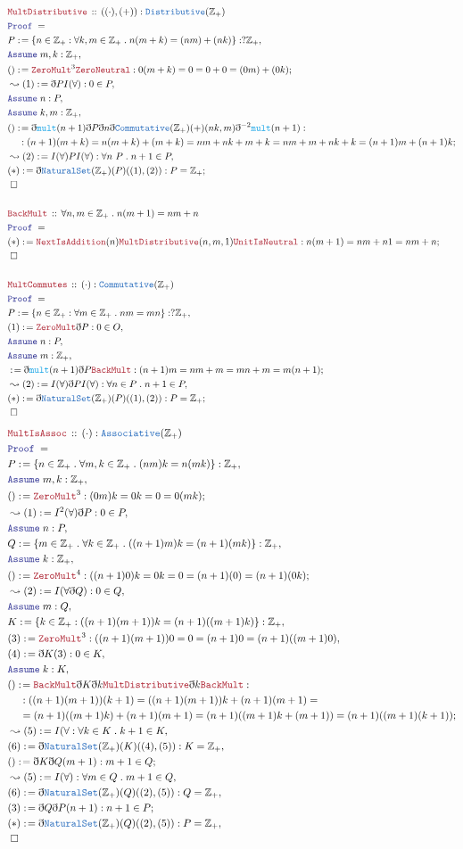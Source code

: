 \documentclass[12pt]{scrartcl}
\newcommand{\TYPE}[1]{\textcolor{NavyBlue}{\mathtt{#1}}}
\newcommand{\FUNC}[1]{\textcolor{Cerulean}{\mathtt{#1}}}
\newcommand{\LOGIC}[1]{\textcolor{Blue}{\mathtt{#1}}}
\newcommand{\THM}[1]{\textcolor{Maroon}{\mathtt{#1}}}
\renewcommand{\.}{\; . \;}
\newcommand{\de}{: \kern 0.1pc =}
\newcommand{\Theorem}[2]{& \THM{#1} \, :: \, #2 \\ & \Proof = \\ }
\newcommand{\NewLine}{\\ & \kern 1pc}
\newcommand{\Page}[1]{ \begin{align*} #1 \end{align*}   }
\newcommand{ \bd }{ \ByDef }
\newcommand{\Int}{\mathbb{Z} }
\newcommand{\Say}[3]{& #1 \de #2 : #3, \\}
\newcommand{\Conclude}[3]{& #1 \de #2 : #3; \\}
\newcommand{\Derive}[3]{& \leadsto #1 \de #2 : #3, \\}
\newcommand{\Assume}[2]{& \LOGIC{Assume} \; #1 : #2, \\}
\newcommand{\QED}{\; \square}
\newcommand{\EndProof}{& \QED \\}
\newcommand{\ByDef}{\eth}
\newcommand{\Proof}{\LOGIC{Proof} \; }
\begin{document}
\Page{
	\Theorem{MultDistributive}{ ((\cdot),(+)) : \TYPE{Distributive}(\Int_+)}
	\Say{P}{\{ n \in \Int_+ : \forall k,m \in \Int_+ \. n(m + k) = (nm) + (nk) \}}{?\Int_+}
	\Assume{m,k}{\Int_+}
	\Conclude{()}{\THM{ZeroMult}^3 \THM{ZeroNeutral}}{ 0(m + k) = 0 = 0 + 0 = (0m) + (0k) }
	\Derive{(1)}{\bd P I(\forall)}{0 \in P}
	\Assume{n}{P}
	\Assume{k,m}{\Int_+}
	\Conclude{()}{\bd \FUNC{mult}(n + 1) \bd P \bd n \bd \TYPE{Commutative}(\Int_+)(+)(nk,m)\bd^{-2} \FUNC{mult}(n + 1) }{ 
		\NewLine:
		(n + 1)(m + k) = 
		n(m + k) + (m + k) = 
		nm + nk + m + k = 
		nm + m + nk +k = 
		(n +1)m + (n + 1)k
		}
	\Derive{(2)}{I(\forall)PI(\forall)}{ \forall n \ P \. n + 1 \in P   }
	\Conclude{(*)}{\bd \TYPE{NaturalSet}(\Int_+)(P)((1),(2))}{P = \Int_+}
	\EndProof
	\\
	\Theorem{BackMult}{\forall n,m \in \Int_+ \. n(m + 1) = nm + n}
	\Conclude{(*)}{\THM{NextIsAddition}(n)\THM{MultDistributive}(n,m,1)\THM{UnitIsNeutral}}{n(m + 1) = nm + n1 = nm + n}
	\EndProof
	\\
	\Theorem{MultCommutes}{(\cdot) : \TYPE{Commutative}(\Int_+)}
	\Say{P}{\{ n \in \Int_+ : \forall m \in \Int_+ \. nm = mn \} }{?\Int_+}
	\Say{(1)}{\THM{ZeroMult}\bd P}{0 \in O}
	\Assume{n}{P}
	\Assume{m}{\Int_+}
	\Conclude{}{\bd \FUNC{mult}(n + 1) \bd P \THM{BackMult} }{ (n + 1)m = nm + m = mn + m = m(n + 1) }
	\Derive{(2)}{I(\forall)\bd P I(\forall)}{ \forall n \in P \. n + 1 \in P }
	\Conclude{(*)}{\bd \TYPE{NaturalSet}(\Int_+)(P)((1),(2))}{ P = \Int_+  }                                         
	\EndProof
}
\Page{
	\Theorem{MultIsAssoc}{(\cdot) : \TYPE{Associative}(\Int_+)}
	\Say{P}{\{ n \in \Int_+ \. \forall m,k \in \Int_+ \. (n m) k = n (m  k) \}}{\Int_+}
	\Assume{m,k}{\Int_+}                    
	\Conclude{()}{\THM{ZeroMult}^3}{(0 m) k = 0 k = 0 = 0 (m k)}
	\Derive{(1)}{I^2(\forall)\bd P}{0 \in P}
	\Assume{n}{P}
	\Say{Q}{\{ m \in \Int_+ \. \forall k \in \Int_+ \. ((n + 1)m)k  = (n + 1)(mk) \}}{\Int_+}
	\Assume{k}{\Int_+}
	\Conclude{()}{\THM{ZeroMult}^4}{((n + 1)0)k = 0k = 0 = (n + 1)(0) = (n+1)(0k) }
	\Derive{(2)}{I(\forall \bd Q)}{0 \in Q}
	\Assume{m}{Q}
	\Say{K}{\{k \in \Int_+ : ((n + 1)(m + 1))k = (n + 1)((m + 1)k)  \}}{\Int_+}
	\Say{(3)}{\THM{ZeroMult}^3 }{ ((n + 1)(m + 1))0 = 0 = (n +1 )0 = (n + 1)((m + 1)0)    }
	\Say{(4)}{\bd  K (3)}{0 \in K}
	\Assume{k}{K}
	\Conclude{()}{\THM{BackMult}\bd K \bd k \THM{MultDistributive}\bd k \THM{BackMult}}
	{ 
		\NewLine :
		((n + 1)(m + 1))(k + 1) =  
		((n + 1)(m + 1) )k  +   (n + 1)(m + 1) = 
		\NewLine =
		(n + 1)((m + 1)k) + (n + 1)(m + 1)  =
		(n + 1)( (m + 1)k + (m + 1)) =
		(n + 1)((m + 1)(k +1))
	}
	\Derive{(5)}{I(\forall}{\forall k \in K \. k + 1 \in K}
	\Say{(6)}{\bd \TYPE{NaturalSet}(\Int_+)(K)((4),(5))}{K = \Int_+}
	\Conclude{()}{\bd K \bd Q (m + 1)}{m + 1 \in Q}
	\Derive{(5)}{I(\forall) }{ \forall m \in Q \.m + 1 \in Q}
	\Say{(6)}{\bd \TYPE{NaturalSet}(\Int_+)(Q)((2),(5))}{Q = \Int_+}
	\Conclude{(3)}{\bd Q \bd P (n + 1)}{n + 1 \in P}
	\Say{(*)}{\bd \TYPE{NaturalSet}(\Int_+)(Q)((2),(5))}{P = \Int_+}
	\EndProof
}
\end{document}
